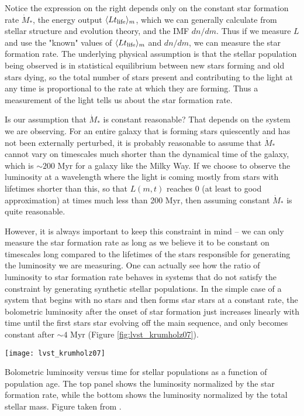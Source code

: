 Notice the expression on the right depends only on the constant star formation rate $\dot{M}_*$, the energy output $\langle L t_{\rm life}\rangle_m$, which we can generally calculate from stellar structure and evolution theory, and the IMF $dn/dm$. Thus if we measure $L$ and use the "known" values of  $\langle L t_{\rm life}\rangle_m$ and $dn/dm$, we can measure the star formation rate. The underlying physical assumption is that the stellar population being observed is in statistical equilibrium between new stars forming and old stars dying, so the total number of stars present and contributing to the light at any time is proportional to the rate at which they are forming. Thus a measurement of the light tells us about the star formation rate.

Is our assumption that $\dot{M}_*$ is constant reasonable? That depends on the system we are observing. For an entire galaxy that is forming stars quiescently and has not been externally perturbed, it is probably reasonable to assume that $\dot{M}_*$ cannot vary on timescales much shorter than the dynamical time of the galaxy, which is $\sim 200$ Myr for a galaxy like the Milky Way. If we choose to observe the luminosity at a wavelength where the light is coming mostly from stars with lifetimes shorter than this, so that $L(m,t)$ reaches 0 (at least to good approximation) at times much less than 200 Myr, then assuming constant $\dot{M}_*$ is quite reasonable.

However, it is always important to keep this constraint in mind -- we can only measure the star formation rate as long as we believe it to be constant on timescales long compared to the lifetimes of the stars responsible for generating the luminosity we are measuring. One can actually see how the ratio of luminosity to star formation rate behaves in systems that do not satisfy the constraint by generating synthetic stellar populations. In the simple case of a system that begins with no stars and then forms star stars at a constant rate, the bolometric luminosity after the onset of star formation just increases linearly with time until the first stars star evolving off the main sequence, and only becomes constant after $\sim 4$ Myr (Figure \ref{fig:lvst_krumholz07}).

\begin{marginfigure}
\texttt{[image: lvst\_krumholz07]}
\caption[Bolometric luminosity versus stellar population age]{
\label{fig:lvst_krumholz07}
Bolometric luminosity versus time for stellar populations as a function of population age. The top panel shows the luminosity normalized by the star formation rate, while the bottom shows the luminosity normalized by the total stellar mass. Figure taken from \citet{krumholz07e}.
}
\end{marginfigure}

